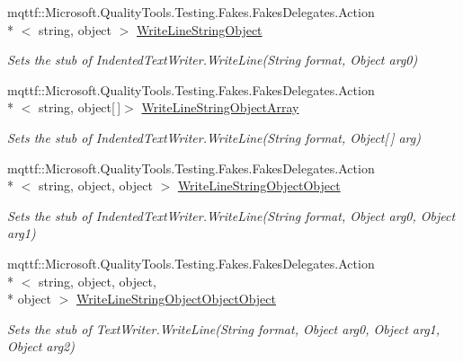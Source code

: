 \begin{DoxyCompactItemize}
mqttf\-::\-Microsoft.\-Quality\-Tools.\-Testing.\-Fakes.\-Fakes\-Delegates.\-Action\\*
$<$ string, object $>$ \hyperlink{class_system_1_1_code_dom_1_1_compiler_1_1_fakes_1_1_stub_indented_text_writer_a50e3cde3ee29fd0cca1333351b6ad8dc}{Write\-Line\-String\-Object}
\begin{DoxyCompactList}\small\item\em Sets the stub of Indented\-Text\-Writer.\-Write\-Line(\-String format, Object arg0)\end{DoxyCompactList}\item 
mqttf\-::\-Microsoft.\-Quality\-Tools.\-Testing.\-Fakes.\-Fakes\-Delegates.\-Action\\*
$<$ string, object\mbox{[}$\,$\mbox{]}$>$ \hyperlink{class_system_1_1_code_dom_1_1_compiler_1_1_fakes_1_1_stub_indented_text_writer_a894d993357523705628c6c06723f2452}{Write\-Line\-String\-Object\-Array}
\begin{DoxyCompactList}\small\item\em Sets the stub of Indented\-Text\-Writer.\-Write\-Line(\-String format, Object\mbox{[}$\,$\mbox{]} arg)\end{DoxyCompactList}\item 
mqttf\-::\-Microsoft.\-Quality\-Tools.\-Testing.\-Fakes.\-Fakes\-Delegates.\-Action\\*
$<$ string, object, object $>$ \hyperlink{class_system_1_1_code_dom_1_1_compiler_1_1_fakes_1_1_stub_indented_text_writer_add691e51ecd610ac889333a435975f0c}{Write\-Line\-String\-Object\-Object}
\begin{DoxyCompactList}\small\item\em Sets the stub of Indented\-Text\-Writer.\-Write\-Line(\-String format, Object arg0, Object arg1)\end{DoxyCompactList}\item 
mqttf\-::\-Microsoft.\-Quality\-Tools.\-Testing.\-Fakes.\-Fakes\-Delegates.\-Action\\*
$<$ string, object, object, \\*
object $>$ \hyperlink{class_system_1_1_code_dom_1_1_compiler_1_1_fakes_1_1_stub_indented_text_writer_a584f7bdbe3d044f48c121f2933a64b1e}{Write\-Line\-String\-Object\-Object\-Object}
\begin{DoxyCompactList}\small\item\em Sets the stub of Text\-Writer.\-Write\-Line(\-String format, Object arg0, Object arg1, Object arg2)\end{DoxyCompactList}\item 

\end{DoxyCompactItemize}
